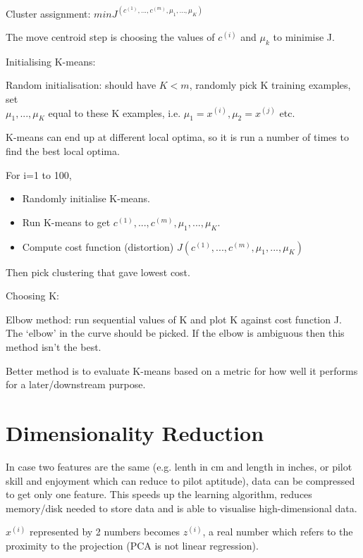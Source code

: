\documentclass[12pt, a4paper]{article}
\begin{document}
{    Cluster assignment: $min J^(c^{(1)},...,c^{(m)},\mu_1,...,\mu_K)$

    The move centroid step is choosing the values of $c^{(i)}$ and $\mu_k$ to
    minimise J.
    
    Initialising K-means:
    
    Random initialisation: should have $K<m$, randomly pick K training
    examples, set\\$\mu_1,...,\mu_K$ equal to these K examples, i.e. $\mu_1 = 
    x^{(i)}, \mu_2 = x^{(j)}$ etc.
    
    K-means can end up at different local optima, so it is run a number of
    times to find the best local optima.

    For i=1 to 100,
    \begin{itemize}
    \vspace{-1em}
      \item Randomly initialise K-means.
      \item Run K-means to get $c^{(1)},...,c^{(m)},\mu_1,...,\mu_K.$
      \item Compute cost function (distortion)  $J(c^{(1)},...,c^{(m)},\mu_1,
            ...,\mu_K)$
    \end{itemize}

    Then pick clustering that gave lowest cost. 

    Choosing K:

    Elbow method: run sequential values of K and plot K against cost function
    J. The `elbow' in the curve should be picked. If the elbow is ambiguous 
    then this method isn't the best. 

    Better method is to evaluate K-means based on a metric for how well it 
    performs for a later/downstream purpose.


  \newpage

\section{Dimensionality Reduction}

  In case two features are the same (e.g. lenth in cm and length in inches, or
  pilot skill and enjoyment which can reduce to pilot aptitude), data
  can be compressed to get only one feature. This speeds up the learning
  algorithm, reduces memory/disk needed to store data and is able to 
  visualise high-dimensional data.  

  $x^{(i)}$ represented by 2 numbers becomes $z^{(i)}$, a real number which 
  refers to the proximity to the projection (PCA is not linear regression). 

}
\end{document}
